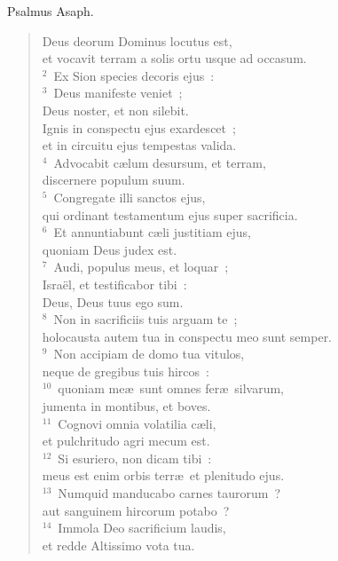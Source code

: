 \lettrine[lines=3,image=true,loversize=0.05,lraise=-0.03]{P}{}salmus Asaph. \begin{flushleft}\begin{verse}\vspace{6pt}Deus deorum Dominus locutus est,\\ et vocavit terram a solis ortu usque ad occasum.\\
${}^{2}$~Ex Sion species decoris ejus~:\\
${}^{3}$~Deus manifeste veniet~;\\ Deus noster, et non silebit.\\ Ignis in conspectu ejus exardescet~;\\ et in circuitu ejus tempestas valida.\\
${}^{4}$~Advocabit c\ae lum desursum, et terram,\\ discernere populum suum.\\
${}^{5}$~Congregate illi sanctos ejus,\\ qui ordinant testamentum ejus super sacrificia.\\
${}^{6}$~Et annuntiabunt c\ae li justitiam ejus,\\ quoniam Deus judex est.\\
${}^{7}$~Audi, populus meus, et loquar~;\\ Isra\"el, et testificabor tibi~:\\ Deus, Deus tuus ego sum.\\
${}^{8}$~Non in sacrificiis tuis arguam te~;\\ holocausta autem tua in conspectu meo sunt semper.\\
${}^{9}$~Non accipiam de domo tua vitulos,\\ neque de gregibus tuis hircos~:\\
${}^{10}$~quoniam me\ae\ sunt omnes fer\ae\ silvarum,\\ jumenta in montibus, et boves.\\
${}^{11}$~Cognovi omnia volatilia c\ae li,\\ et pulchritudo agri mecum est.\\
${}^{12}$~Si esuriero, non dicam tibi~:\\ meus est enim orbis terr\ae\ et plenitudo ejus.\\
${}^{13}$~Numquid manducabo carnes taurorum~?\\ aut sanguinem hircorum potabo~?\\
${}^{14}$~Immola Deo sacrificium laudis,\\ et redde Altissimo vota tua.\\

\end{verse}
\end{flushleft}
